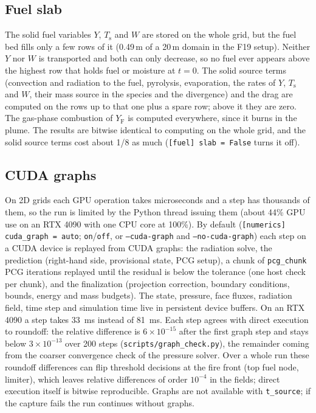 \documentclass[11pt,a4paper]{article}
\newcommand{\code}[1]{\texttt{#1}}
\newcommand{\Yf}{Y_\text{F}}
\begin{document}
\subsection{Fuel slab}
The solid fuel variables $Y$, $T_\text{s}$ and $W$ are stored on the whole grid, but the fuel bed fills only
a few rows of it (0.49\,m of a 20\,m domain in the F19 setup). Neither $Y$ nor $W$ is transported and
both can only decrease, so no fuel ever appears above the highest row that holds fuel or moisture at
$t=0$. The solid source terms (convection and radiation to the fuel, pyrolysis, evaporation, the rates
of $Y$, $T_\text{s}$ and $W$, their mass source in the species and the divergence) and the drag are computed
on the rows up to that one plus a spare row; above it they are zero. The gas-phase combustion of $\Yf$
is computed everywhere, since it burns in the plume. The results are bitwise identical to computing on
the whole grid, and the solid source terms cost about 1/8 as much (\code{[fuel] slab = False} turns
it off).

\subsection{CUDA graphs}
On 2D grids each GPU operation takes microseconds and a step has thousands of them, so the run is
limited by the Python thread issuing them (about 44\% GPU use on an RTX 4090 with one CPU core at
100\%). By default (\code{[numerics] cuda\_graph = auto}; \code{on}/\code{off}, or \code{--cuda-graph}
and \code{--no-cuda-graph}) each step on a CUDA device is replayed from CUDA graphs: the radiation
solve, the prediction (right-hand side, provisional state, PCG setup), a chunk of \code{pcg\_chunk}
PCG iterations replayed until the residual is below the tolerance (one host check per chunk), and the
finalization (projection correction, boundary conditions, bounds, energy and mass budgets). The
state, pressure, face fluxes, radiation field, time step and simulation time live in persistent
device buffers. On an RTX 4090 a step takes 33~ms instead of 81~ms. Each step agrees with direct
execution to roundoff: the relative difference is $6\times10^{-15}$ after the first graph step and stays
below $3\times10^{-13}$ over 200 steps (\code{scripts/graph\_check.py}), the remainder coming from the
coarser convergence check of the pressure solver. Over a whole run these roundoff differences can
flip threshold decisions at the fire front (top fuel node, limiter), which leaves relative
differences of order $10^{-4}$ in the fields; direct execution itself is bitwise reproducible. Graphs
are not available with \code{t\_source}; if the capture fails the run continues without graphs.
\end{document}

